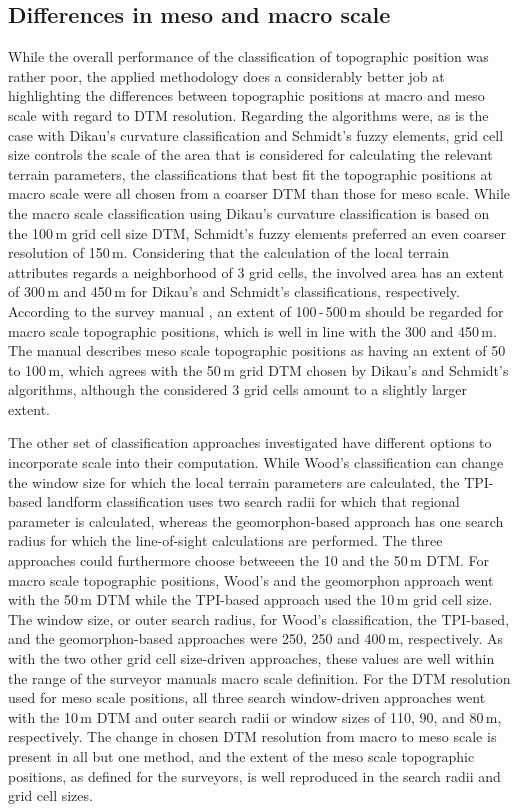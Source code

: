 \documentclass[preprint,12pt,authoryear]{elsarticle}
\begin{document}
\subsection{Differences in meso and macro scale}
While the overall performance of the classification of topographic position was rather poor, the applied methodology does a considerably better job at highlighting the differences between topographic positions at macro and meso scale with regard to DTM resolution.
Regarding the algorithms were, as is the case with Dikau's curvature classification and Schmidt's fuzzy elements, grid cell size controls the scale of the area that is considered for calculating the relevant terrain parameters, the classifications that best fit the topographic positions at macro scale were all chosen from a coarser DTM than those for meso scale. While the macro scale classification using Dikau's curvature classification is based on the 100\,m grid cell size DTM, Schmidt's fuzzy elements preferred an even coarser resolution of 150\,m. Considering that the calculation of the local terrain attributes regards a neighborhood of 3 grid cells, the involved area has an extent of 300\,m and 450\,m for Dikau's and Schmidt's classifications, respectively. According to the survey manual \citep{Englisch1998}, an extent of 100\,-\,500\,m should be regarded for macro scale topographic positions, which is well in line with the 300 and 450\,m. The manual describes meso scale topographic positions as having an extent of 50 to 100\,m, which agrees with the 50\,m grid DTM chosen by Dikau's and Schmidt's algorithms, although the considered 3 grid cells amount to a slightly larger extent.

The other set of classification approaches investigated have different options to incorporate scale into their computation. While Wood's classification can change the window size for which the local terrain parameters are calculated, the TPI-based landform classification uses two search radii for which that regional parameter is calculated, whereas the geomorphon-based approach has one search radius for which the line-of-sight calculations are performed. The three approaches could furthermore choose betweeen the 10 and the 50\,m DTM. For macro scale topographic positions, Wood's and the geomorphon approach went with the 50\,m DTM while the TPI-based approach used the 10\,m grid cell size. The window size, or outer search radius, for Wood's classification, the TPI-based, and the geomorphon-based approaches were 250, 250 and 400\,m, respectively. As with the two other grid cell size-driven approaches, these values are well within the range of the surveyor manuals macro scale definition. For the DTM resolution used for meso scale positions, all three search window-driven approaches went with the 10\,m DTM and outer search radii or window sizes of 110, 90, and 80\,m, respectively. The change in chosen DTM resolution from macro to meso scale is present in all but one method, and the extent of the meso scale topographic positions, as defined for the surveyors, is well reproduced in the search radii and grid cell sizes.
\end{document}
